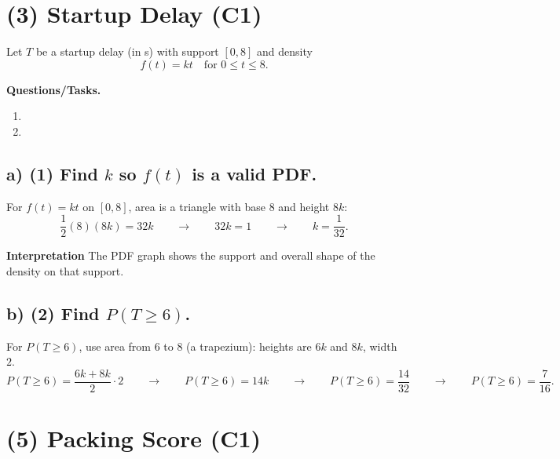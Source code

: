 \section{(3) Startup Delay (C1)}
\label{sec:startup-delay-c1}

Let $T$ be a startup delay (in s) with support $[0,8]$ and density
\[
f(t)=kt\quad\text{for }0\le t\le 8.
\]

\textbf{Questions/Tasks.}
\begin{enumerate}[label=\textbf{\alph*)}]
	\item {}
	\item {}
\end{enumerate}


\subsection*{a) \textbf{(1)} Find $k$ so $f(t)$ is a valid PDF.}
\label{subsec:startup-delay-c1-a}

For $f(t)=kt$ on $[0,8]$, area is a triangle with base $8$ and height $8k$:
\[
\frac12(8)(8k)=32k\qquad \longrightarrow \qquad 32k=1\qquad \longrightarrow \qquad k=\frac1{32}.
\]

\textbf{Interpretation}
The PDF graph shows the support and overall shape of the density on that support.


\subsection*{b) \textbf{(2)} Find $P(T\ge 6)$.}
\label{subsec:startup-delay-c1-b}
For $P(T\ge6)$, use area from $6$ to $8$ (a trapezium): heights are $6k$ and $8k$, width $2$.
\[
P(T\ge6)=\frac{6k+8k}{2}\cdot2\qquad \longrightarrow \qquad P(T\ge6)=14k\qquad \longrightarrow \qquad P(T\ge6)=\frac{14}{32}\qquad \longrightarrow \qquad P(T\ge6)=\frac{7}{16}.
\]

\section{(5) Packing Score (C1)}
\label{sec:packing-score-c1}

